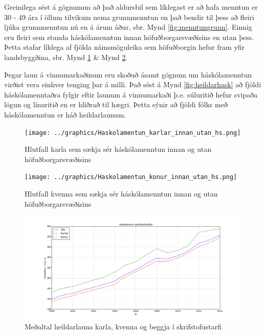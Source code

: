 \documentclass[12pt, git, final]{rureport}
\begin{document}
Greinilega sést á gögnunum að það aldursbil sem líklegast er að hafa menntun er 30 - 49 ára í öllum tilvikum nema grunnmenntun en það bendir til þess að fleiri ljúka grunnmenntun nú en á árum áður, sbr. Mynd \ref{fig:menntungrunn}. Einnig eru fleiri sem stunda háskólamenntun innan höfuðborgarsvæðisins en utan þess. Þetta stafar líklega af fjölda námsmöguleika sem höfuðborgin hefur fram yfir landsbyggðina, sbr.  Mynd \ref{fig:menntukarla} \& Mynd \ref{fig:menntunkonur}.

Þegar laun á vinnumarkaðinum eru skoðuð ásamt gögnum um háskólamenntun virðist vera einhver tenging þar á milli. Það sést á Mynd \ref{fig:heildarhask} að fjöldi háskólamenntaðra fylgir eftir launum á vinnumarkaði þ.e. súluritið hefur svipaða lögun og línuritið en er hliðrað til hægri. Þetta sýnir að fjöldi fólks með háskólamenntun er háð heildarlaunum.

\pagebreak

\begin{figure}
	\centering 
	\texttt{[image: ../graphics/Haskolamentun\_karlar\_innan\_utan\_hs.png]}
	\caption{Hlutfall karla sem sækja sér háskólamenntun innan og utan höfuðborgarsvæðisins \label{fig:menntukarla}}
\end{figure}

\begin{figure}
	\centering 
	\texttt{[image: ../graphics/Haskolamentun\_konur\_innan\_utan\_hs.png]}
	\caption{Hlutfall kvenna sem sækja sér háskólamenntun innan og utan höfuðborgarsvæðisins\label{fig:menntunkonur}}
\end{figure}

\begin{figure}
	\centering 
	\includegraphics[width=\textwidth]{graphics/heildar_laun.png}
	\caption{Meðaltal heildarlauna karla, kvenna og beggja í skrifstofustarfi \label{fig:heildarlaun}}
\end{figure}
\end{document}
